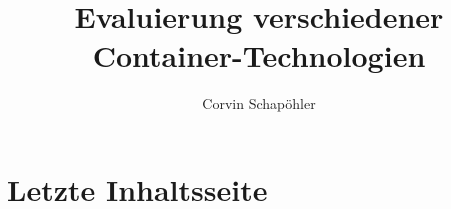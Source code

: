 

\title{Evaluierung verschiedener Container-Technologien}
\author{Corvin Schapöhler}


	
	
	
	
	\frontmatter
	\pagestyle{front}
	
%	
	

	\setcounter{tocdepth}{1}
	\tableofcontents

	\mainmatter
	\pagestyle{main}
	
	
	\chapter{Letzte Inhaltsseite}
	
	\backmatter
	\pagestyle{back}
	
	
